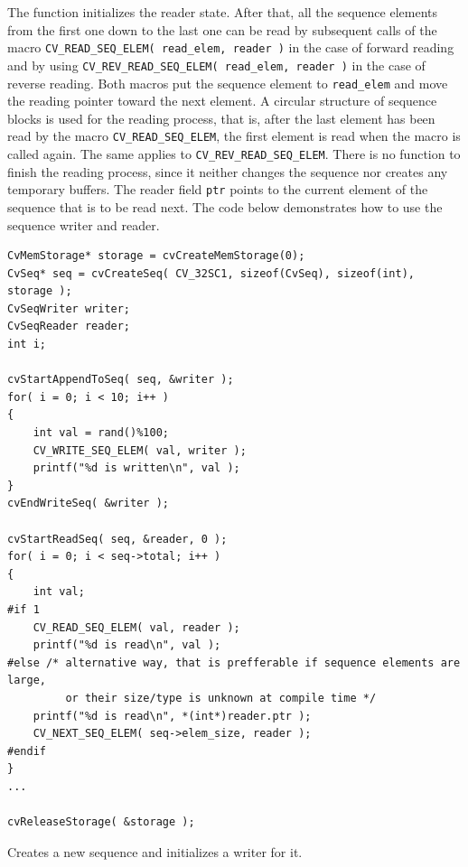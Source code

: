 The function initializes the reader state. After
that, all the sequence elements from the first one down to the last one
can be read by subsequent calls of the macro
\texttt{CV\_READ\_SEQ\_ELEM( read\_elem, reader )}
in the case of forward reading and by using
\texttt{CV\_REV\_READ\_SEQ\_ELEM( read\_elem, reader )}
in the case of reverse
reading. Both macros put the sequence element to \texttt{read\_elem} and
move the reading pointer toward the next element. A circular structure
of sequence blocks is used for the reading process, that is, after the
last element has been read by the macro \texttt{CV\_READ\_SEQ\_ELEM}, the
first element is read when the macro is called again. The same applies to
\texttt{CV\_REV\_READ\_SEQ\_ELEM}. There is no function to finish the reading
process, since it neither changes the sequence nor creates any temporary
buffers. The reader field \texttt{ptr} points to the current element of
the sequence that is to be read next. The code below demonstrates how
to use the sequence writer and reader.

\begin{lstlisting}
CvMemStorage* storage = cvCreateMemStorage(0);
CvSeq* seq = cvCreateSeq( CV_32SC1, sizeof(CvSeq), sizeof(int), storage );
CvSeqWriter writer;
CvSeqReader reader;
int i;

cvStartAppendToSeq( seq, &writer );
for( i = 0; i < 10; i++ )
{
    int val = rand()%100;
    CV_WRITE_SEQ_ELEM( val, writer );
    printf("%d is written\n", val );
}
cvEndWriteSeq( &writer );

cvStartReadSeq( seq, &reader, 0 );
for( i = 0; i < seq->total; i++ )
{
    int val;
#if 1
    CV_READ_SEQ_ELEM( val, reader );
    printf("%d is read\n", val );
#else /* alternative way, that is prefferable if sequence elements are large,
         or their size/type is unknown at compile time */
    printf("%d is read\n", *(int*)reader.ptr );
    CV_NEXT_SEQ_ELEM( seq->elem_size, reader );
#endif
}
...

cvReleaseStorage( &storage );
\end{lstlisting}

Creates a new sequence and initializes a writer for it.


